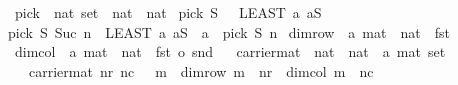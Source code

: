 \begin{isabellebody}
\isamarkupfalse%
%
\endisatagproof
{\isafoldproof}%
%
\isadelimproof
\isanewline
%
\endisadelimproof
{}\isamarkupfalse%
\isanewline
\isanewline
\isanewline
{}\isamarkupfalse%
\ pick\ {\isacharcolon}{\kern0pt}{\isacharcolon}{\kern0pt}\ {\isachardoublequoteopen}nat\ set\ {\isasymRightarrow}\ nat\ {\isasymRightarrow}\ nat{\isachardoublequoteclose}\ \isanewline
{\isachardoublequoteopen}pick\ S\ {}\ {\isacharequal}{\kern0pt}\ {\isacharparenleft}{\kern0pt}LEAST\ a{\isachardot}{\kern0pt}\ a{\isasymin}S{\isacharparenright}{\kern0pt}{\isachardoublequoteclose}\ {\isacharbar}{\kern0pt}\isanewline
{\isachardoublequoteopen}pick\ S\ {\isacharparenleft}{\kern0pt}Suc\ n{\isacharparenright}{\kern0pt}\ {\isacharequal}{\kern0pt}\ {\isacharparenleft}{\kern0pt}LEAST\ a{\isachardot}{\kern0pt}\ a{\isasymin}S\ {\isasymand}\ a\ {\isachargreater}{\kern0pt}\ pick\ S\ n{\isacharparenright}{\kern0pt}{\isachardoublequoteclose}\isanewline
\isanewline
\isanewline
\isanewline
{}\isamarkupfalse%
\ dim{\isacharunderscore}{\kern0pt}row\ {\isacharcolon}{\kern0pt}{\isacharcolon}{\kern0pt}\ {\isachardoublequoteopen}{\isacharprime}{\kern0pt}a\ mat\ {\isasymRightarrow}\ nat{\isachardoublequoteclose}\ \ fst%
\isadelimproof
\ %
\endisadelimproof
%
\isatagproof
\isacommand{{\isachardot}{\kern0pt}}\isamarkupfalse%
%
\endisatagproof
{\isafoldproof}%
%
\isadelimproof
%
\endisadelimproof
\isanewline
{}\isamarkupfalse%
\ dim{\isacharunderscore}{\kern0pt}col\ {\isacharcolon}{\kern0pt}{\isacharcolon}{\kern0pt}\ {\isachardoublequoteopen}{\isacharprime}{\kern0pt}a\ mat\ {\isasymRightarrow}\ nat{\isachardoublequoteclose}\ \ {\isachardoublequoteopen}fst\ o\ snd{\isachardoublequoteclose}%
\isadelimproof
\ %
\endisadelimproof
%
\isatagproof
\isacommand{{\isachardot}{\kern0pt}}\isamarkupfalse%
%
\endisatagproof
{\isafoldproof}%
%
\isadelimproof
%
\endisadelimproof
\isanewline
{}\isamarkupfalse%
\ carrier{\isacharunderscore}{\kern0pt}mat\ {\isacharcolon}{\kern0pt}{\isacharcolon}{\kern0pt}\ {\isachardoublequoteopen}nat\ {\isasymRightarrow}\ nat\ {\isasymRightarrow}\ {\isacharprime}{\kern0pt}a\ mat\ set{\isachardoublequoteclose}\isanewline
\ \ \ {\isachardoublequoteopen}carrier{\isacharunderscore}{\kern0pt}mat\ nr\ nc\ {\isacharequal}{\kern0pt}\ {\isacharbraceleft}{\kern0pt}\ m\ {\isachardot}{\kern0pt}\ dim{\isacharunderscore}{\kern0pt}row\ m\ {\isacharequal}{\kern0pt}\ nr\ {\isasymand}\ dim{\isacharunderscore}{\kern0pt}col\ m\ {\isacharequal}{\kern0pt}\ nc{\isacharbraceright}{\kern0pt}{\isachardoublequoteclose}\isanewline

\end{isabellebody}
